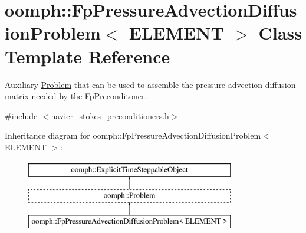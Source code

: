 \hypertarget{classoomph_1_1FpPressureAdvectionDiffusionProblem}{}\section{oomph\+:\+:Fp\+Pressure\+Advection\+Diffusion\+Problem$<$ E\+L\+E\+M\+E\+NT $>$ Class Template Reference}
\label{classoomph_1_1FpPressureAdvectionDiffusionProblem}


Auxiliary \hyperlink{classoomph_1_1Problem}{Problem} that can be used to assemble the pressure advection diffusion matrix needed by the Fp\+Preconditoner.  




{\ttfamily \#include $<$navier\+\_\+stokes\+\_\+preconditioners.\+h$>$}

Inheritance diagram for oomph\+:\+:Fp\+Pressure\+Advection\+Diffusion\+Problem$<$ E\+L\+E\+M\+E\+NT $>$\+:\begin{figure}[H]
\begin{center}
\leavevmode
\includegraphics[height=3.000000cm]{classoomph_1_1FpPressureAdvectionDiffusionProblem}
\end{center}
\end{figure}
